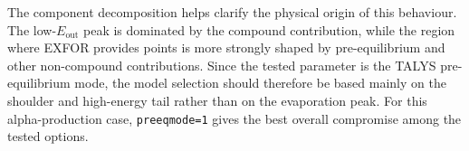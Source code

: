 The component decomposition helps clarify the physical origin of this behaviour. The low-$E_{\mathrm{out}}$ peak is dominated by the compound contribution, while the region where EXFOR provides points is more strongly shaped by pre-equilibrium and other non-compound contributions. Since the tested parameter is the TALYS pre-equilibrium mode, the model selection should therefore be based mainly on the shoulder and high-energy tail rather than on the evaporation peak. For this alpha-production case, \texttt{preeqmode=1} gives the best overall compromise among the tested options.

